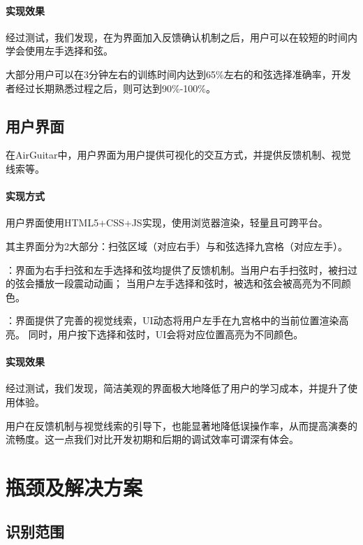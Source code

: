             \paragraph{实现效果} 经过测试，我们发现，在为界面加入反馈确认机制之后，用户可以在较短的时间内学会使用左手选择和弦。

            大部分用户可以在3分钟左右的训练时间内达到65\%左右的和弦选择准确率，开发者经过长期熟悉过程之后，则可达到90\%-100\%。

        \subsection{用户界面}
        在AirGuitar中，用户界面为用户提供可视化的交互方式，并提供反馈机制、视觉线索等。

            \paragraph{实现方式} 用户界面使用HTML5+CSS+JS实现，使用浏览器渲染，轻量且可跨平台。

            其主界面分为2大部分：扫弦区域（对应右手）与和弦选择九宫格（对应左手）。

            \begin{enumerate}
                ：界面为右手扫弦和左手选择和弦均提供了反馈机制。当用户右手扫弦时，被扫过的弦会播放一段震动动画；
                当用户左手选择和弦时，被选和弦会被高亮为不同颜色。

                ：界面提供了完善的视觉线索，UI动态将用户左手在九宫格中的当前位置渲染高亮。
                同时，用户按下选择和弦时，UI会将对应位置高亮为不同颜色。
            \end{enumerate}

            \paragraph{实现效果} 经过测试，我们发现，简洁美观的界面极大地降低了用户的学习成本，并提升了使用体验。

            用户在反馈机制与视觉线索的引导下，也能显著地降低误操作率，从而提高演奏的流畅度。这一点我们对比开发初期和后期的调试效率可谓深有体会。

    \section{瓶颈及解决方案}

        \subsection{识别范围}

